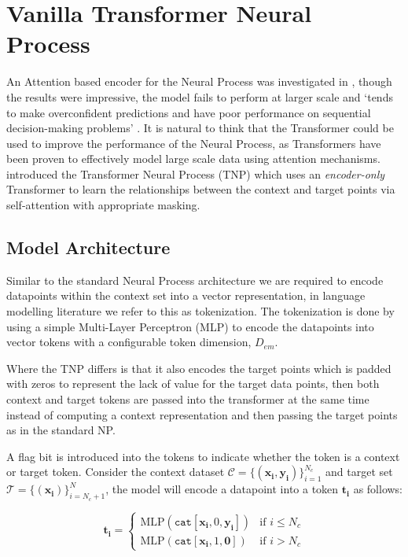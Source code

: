 \documentclass[../../main.tex]{subfiles}
\begin{document}
\section{Vanilla Transformer Neural Process}

An Attention based encoder for the Neural Process was investigated in \cite{kim2019attentive}, though the results were impressive, the model fails to perform at larger scale and `tends to make overconfident predictions and have poor performance on sequential decision-making problems' \cite{nguyen2023transformer}. It is natural to think that the Transformer \cite{vaswani2017attention} could be used to improve the performance of the Neural Process, as Transformers have been proven to effectively model large scale data using attention mechanisms. \cite{nguyen2023transformer} introduced the Transformer Neural Process (TNP) which uses an \emph{encoder-only} Transformer to learn the relationships between the context and target points via self-attention with appropriate masking. 

\subsection{Model Architecture}

Similar to the standard Neural Process architecture we are required to encode datapoints within the context set into a vector representation, in language modelling literature we refer to this as tokenization. The tokenization is done by using a simple Multi-Layer Perceptron (MLP) to encode the datapoints into vector tokens with a configurable token dimension, $D_{em}$.

Where the TNP differs is that it also encodes the target points which is padded with zeros to represent the lack of value for the target data points, then both context and target tokens are passed into the transformer at the same time instead of computing a context representation and then passing the target points as in the standard NP.

A flag bit is introduced into the tokens to indicate whether the token is a context or target token. Consider the context dataset $\mathcal{C} = \{(\bm{x_i}, \bm{y_i})\}_{i=1}^{N_c}$ and target set $\mathcal{T} = \{(\bm{x_i})\}_{i=N_c+1}^{N}$, the model will encode a datapoint into a token $\bm{t_i}$ as follows:

\[
	\bm{t_i} = \begin{cases}
		\text{MLP}(\texttt{cat}[\bm{x_i},  0, \bm{y_i}]) & \text{if } i \leq N_c \\
		\text{MLP}(\texttt{cat}[\bm{x_i},  1, \bm{ 0}]) & \text{if } i > N_c
	\end{cases}
\]
\end{document}
